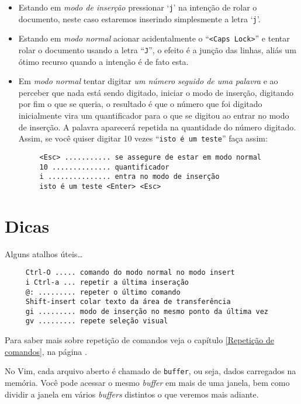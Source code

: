\begin{itemize}

\item Estando em {\em{modo de inserção}} pressionar `{\tt j}' na intenção
de rolar o documento, neste caso estaremos inserindo simplesmente a letra `{\tt j}'. 

\item Estando em {\em{modo normal}} acionar acidentalmente o ``\verb+<Caps Lock>+'' 
e tentar rolar o documento usando a letra ``\verb+J+'', o efeito é a
junção das linhas, aliás um ótimo recurso quando a intenção é de fato esta.

\item Em {\em{modo normal}} tentar digitar {\em{um número seguido de uma palavra}} e ao perceber que 
nada está sendo digitado, iniciar o modo de inserção, digitando por fim o que se queria, 
o resultado é que o número que foi digitado inicialmente vira um quantificador para o que 
se digitou ao entrar no modo de inserção. A palavra aparecerá repetida na quantidade do 
número digitado. Assim, se você quiser digitar 10 vezes ``\verb+isto é um teste+''
 faça assim:

\begin{verbatim}
     <Esc> ........... se assegure de estar em modo normal
     10 .............. quantificador
     i ............... entra no modo de inserção
     isto é um teste <Enter> <Esc>  
\end{verbatim}

\end{itemize}


\section{Dicas}
\label{Dicas}
Alguns atalhos úteis\dots
\begin{verbatim}
     Ctrl-O ..... comando do modo normal no modo insert
     i Ctrl-a ... repetir a última inseração
     @: ......... repeter o último comando
     Shift-insert colar texto da área de transferência
     gi ......... modo de inserção no mesmo ponto da última vez
     gv ......... repete seleção visual
\end{verbatim}

Para saber mais sobre repetição de comandos veja o capítulo \ref{Repetição de comandos},
na página \pageref{Repetição de comandos}.

No Vim, cada arquivo aberto é chamado de \verb|buffer|, ou seja, dados
carregados na memória. Você pode acessar o mesmo {\em buffer} em mais de uma
janela, bem como dividir a janela em vários {\em buffers} distintos o que veremos
mais adiante.


